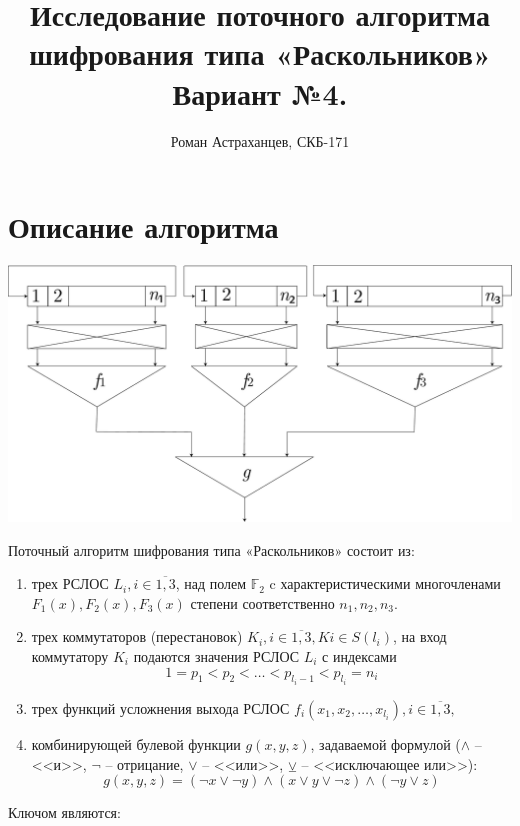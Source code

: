 \documentclass[a4paper,12pt]{article}
\title{Исследование поточного алгоритма шифрования типа «Раскольников» \linebreak Вариант №4.}
\author{Роман Астраханцев, СКБ-171}
\theoremstyle{definition}
\begin{document}
	\maketitle
	
	\tableofcontents
	
	\section*{Описание алгоритма}

	\includegraphics[width=\textwidth]{cipher}

	Поточный алгоритм шифрования типа «Раскольников» состоит из:
	
	\begin{enumerate}
	\item трех РСЛОС $L_i, i \in \overline{1,3}$, над полем $\mathbb{F}_2$ c характеристическими многочленами
	$F_1(x), F_2(x), F_3(x)$ степени соответственно $n_1, n_2, n_3$.
	
	\item трех коммутаторов (перестановок) $K_i, i \in \overline{1,3}, Ki \in S (l_i)$, на вход коммутатору $K_i$
	подаются значения РСЛОС $L_i$ с индексами
	\[ 1 = p_1 < p_2 < \dots < p_{l_i-1} < p_{l_i} = n_i \]

	\item трех функций усложнения выхода РСЛОС $f_i (x_1, x_2, \dots, x_{l_i}), i \in \overline{1,3},$ 
	
	\item комбинирующей булевой функции $g(x,y,z)$, задаваемой формулой ($\land$ -- <<и>>, $\neg$ -- отрицание, $\lor$ -- <<или>>, $\veebar$ -- <<исключающее или>>):
	\[ g(x,y,z) = (\neg x \lor \neg y) \land (x \lor y \lor \neg z) \land (\neg y \lor z) \]
	
	\end{enumerate}

	Ключом являются:
	
\end{document}
